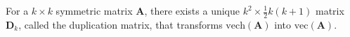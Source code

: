 For a
$
k \times k
$
symmetric matrix
$
\mathbf{A}
$,
there exists a unique
$
k^2 \times \frac{1}{2} k \left( k + 1 \right)
$
matrix
$
\mathbf{D}_{k}
$,
called the duplication matrix,
that transforms
$
\mathrm{vech}
\left(
\mathbf{A}
\right)
$
into
$
\mathrm{vec}
\left(
\mathbf{A}
\right)
$.
